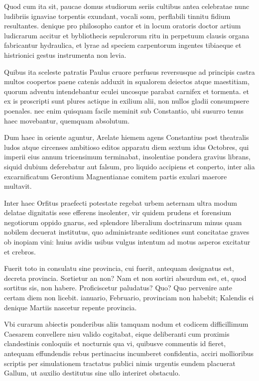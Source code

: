 \documentclass[12pt]{article}
\begin{document}
Quod cum ita sit, paucae domus studiorum seriis cultibus antea celebratae nunc ludibriis ignaviae torpentis exundant, vocali sonu, perflabili tinnitu fidium resultantes. denique pro philosopho cantor et in locum oratoris doctor artium ludicrarum accitur et bybliothecis sepulcrorum ritu in perpetuum clausis organa fabricantur hydraulica, et lyrae ad speciem carpentorum ingentes tibiaeque et histrionici gestus instrumenta non levia.

Quibus ita sceleste patratis Paulus cruore perfusus reversusque ad principis castra multos coopertos paene catenis adduxit in squalorem deiectos atque maestitiam, quorum adventu intendebantur eculei uncosque parabat carnifex et tormenta. et ex is proscripti sunt plures actique in exilium alii, non nullos gladii consumpsere poenales. nec enim quisquam facile meminit sub Constantio, ubi susurro tenus haec movebantur, quemquam absolutum.

Dum haec in oriente aguntur, Arelate hiemem agens Constantius post theatralis ludos atque circenses ambitioso editos apparatu diem sextum idus Octobres, qui imperii eius annum tricensimum terminabat, insolentiae pondera gravius librans, siquid dubium deferebatur aut falsum, pro liquido accipiens et conperto, inter alia excarnificatum Gerontium Magnentianae comitem partis exulari maerore multavit.

Inter haec Orfitus praefecti potestate regebat urbem aeternam ultra modum delatae dignitatis sese efferens insolenter, vir quidem prudens et forensium negotiorum oppido gnarus, sed splendore liberalium doctrinarum minus quam nobilem decuerat institutus, quo administrante seditiones sunt concitatae graves ob inopiam vini: huius avidis usibus vulgus intentum ad motus asperos excitatur et crebros.

Fuerit toto in consulatu sine provincia, cui fuerit, antequam designatus est, decreta provincia. Sortietur an non? Nam et non sortiri absurdum est, et, quod sortitus sis, non habere. Proficiscetur paludatus? Quo? Quo pervenire ante certam diem non licebit. ianuario, Februario, provinciam non habebit; Kalendis ei denique Martiis nascetur repente provincia.

Vbi curarum abiectis ponderibus aliis tamquam nodum et codicem difficillimum Caesarem convellere nisu valido cogitabat, eique deliberanti cum proximis clandestinis conloquiis et nocturnis qua vi, quibusve commentis id fieret, antequam effundendis rebus pertinacius incumberet confidentia, acciri mollioribus scriptis per simulationem tractatus publici nimis urgentis eundem placuerat Gallum, ut auxilio destitutus sine ullo interiret obstaculo.
\end{document}
